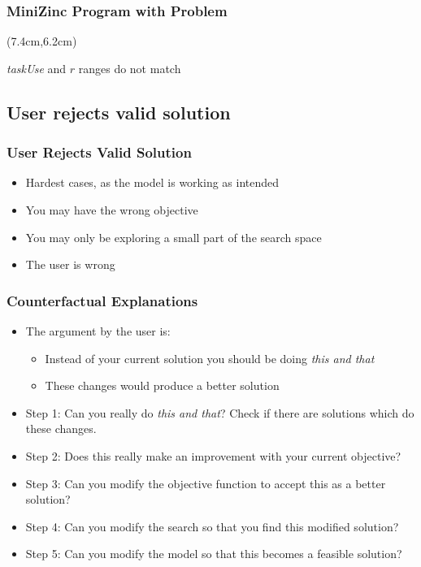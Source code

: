 \begin{frame}[fragile]
\frametitle{MiniZinc Program with Problem}

\begin{textblock*}{6cm}(7.4cm,6.2cm)
\emph{taskUse} and $r$ ranges do not match
\end{textblock*}

\end{frame}

\subsection{User rejects valid solution}

\begin{frame}
\frametitle{User Rejects Valid Solution}
\begin{itemize}
\item Hardest cases, as the model is working as intended
\item You may have the wrong objective
\item You may only be exploring a small part of the search space
\item The user is wrong
\end{itemize}
\end{frame}

\begin{frame}
\frametitle{Counterfactual Explanations}
\begin{itemize}
\item The argument by the user is:
\begin{itemize}
\item Instead of your current solution you should be doing \textit{this and that}
\item These changes would produce a better solution
\end{itemize}
\item Step 1: Can you really do \textit{this and that}? Check if there are solutions which do these changes.
\item Step 2: Does this really make an improvement with your current objective?
\item Step 3: Can you modify the objective function to accept this as a better solution?
\item Step 4: Can you modify the search so that you find this modified solution?
\item Step 5: Can you modify the model so that this becomes a feasible solution?
\end{itemize}
\end{frame}

